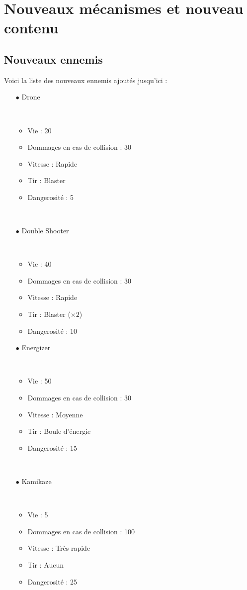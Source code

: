 \documentclass[12pt,a4paper]{article}
\begin{document}
	\section{Nouveaux mécanismes et nouveau contenu}
		\subsection{Nouveaux ennemis}
		Voici la liste des nouveaux ennemis ajoutés jusqu'ici :
		\begin{itemize}
			\item[$\bullet$ Drone]
				\par~
				\begin{itemize}
					\item Vie : 20
					\item Dommages en cas de collision : 30
					\item Vitesse : Rapide
					\item Tir : Blaster
					\item Dangerosité : 5%
				\end{itemize}
				\par~
			\item[$\bullet$ Double Shooter]
				\par~
				\begin{itemize}
					\item Vie : 40
					\item Dommages en cas de collision : 30
					\item Vitesse : Rapide
					\item Tir : Blaster ($\times2$)
					\item Dangerosité : 10%
				\end{itemize}
			\item[$\bullet$ Energizer]
				\par~
				\begin{itemize}
					\item Vie : 50
					\item Dommages en cas de collision : 30
					\item Vitesse : Moyenne
					\item Tir : Boule d'énergie
					\item Dangerosité : 15%
				\end{itemize}
				\par~
			\item[$\bullet$ Kamikaze]
				\par~
				\begin{itemize}			
					\item Vie : 5
					\item Dommages en cas de collision : 100
					\item Vitesse : Très rapide
					\item Tir : Aucun
					\item Dangerosité : 25%
				\end{itemize}
				\par~
		\end{itemize}
		
\end{document}
